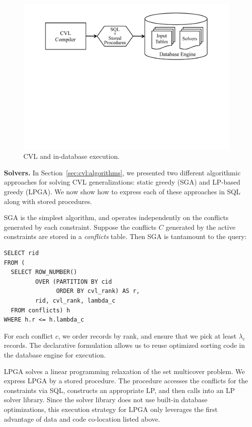 \documentclass[11pt, oneside]{report}
\newcommand{\minisec}[1]{\noindent\textbf{#1.}}
\begin{document}
{\begin{figure}[htbp]
\begin{center}
\includegraphics[scale=.35,viewport=400 375 450 550]{figs-cvl/indatabase-execution.pdf}
\caption{CVL and in-database execution.}
\label{fig:indatabase}
\end{center}
\vspace*{-1ex}
\end{figure}

\minisec{Solvers}
In Section~\ref{sec:cvl:algorithms}, we presented two different algorithmic approaches for solving CVL generalizations: static greedy (SGA) and LP-based greedy (LPGA). We now show how to express each of these approaches in SQL along with stored procedures. 

SGA is the simplest algorithm, and operates independently on the conflicts generated by each constraint. Suppose the conflicts $C$ generated by the active constraints are stored in a \emph{conflicts} table. Then SGA is tantamount to the query:

\begin{lstlisting}
SELECT rid
FROM (
  SELECT ROW_NUMBER() 
         OVER (PARTITION BY cid
               ORDER BY cvl_rank) AS r,
         rid, cvl_rank, lambda_c
  FROM conflicts) h
WHERE h.r <= h.lambda_c
\end{lstlisting}

For each conflict $c$, we order records by rank, and ensure that we pick at least $\lambda_c$ records. The declarative formulation allows us to reuse optimized sorting code in the database engine for execution.

LPGA solves a linear programming relaxation of the set multicover problem. We express LPGA by a stored procedure. The procedure accesses the conflicts for the constraints via SQL, constructs an appropriate LP, and then calls into an LP solver library. Since the solver library does not use built-in database optimizations, this execution strategy for LPGA only leverages the first advantage of data and code co-location listed above.

}
\end{document}
